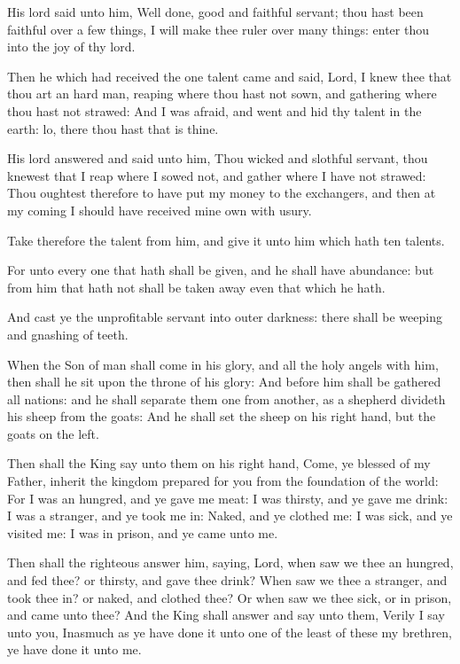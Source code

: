 \Verse His lord said unto him, Well done, good and faithful servant; thou hast been faithful over a few things, I will make thee ruler over many things: enter thou into the joy of thy lord.

\Verse Then he which had received the one talent came and said, Lord, I knew thee that thou art an hard man, reaping where thou hast not sown, and gathering where thou hast not strawed: \Verse And I was afraid, and went and hid thy talent in the earth: lo, there thou hast that is thine.

\Verse His lord answered and said unto him, Thou wicked and slothful servant, thou knewest that I reap where I sowed not, and gather where I have not strawed: \Verse Thou oughtest therefore to have put my money to the exchangers, and then at my coming I should have received mine own with usury.

\Verse Take therefore the talent from him, and give it unto him which hath ten talents.

\Verse For unto every one that hath shall be given, and he shall have abundance: but from him that hath not shall be taken away even that which he hath.

\Verse And cast ye the unprofitable servant into outer darkness: there shall be weeping and gnashing of teeth.

\Verse When the Son of man shall come in his glory, and all the holy angels with him, then shall he sit upon the throne of his glory: \Verse And before him shall be gathered all nations: and he shall separate them one from another, as a shepherd divideth his sheep from the goats: \Verse And he shall set the sheep on his right hand, but the goats on the left.

\Verse Then shall the King say unto them on his right hand, Come, ye blessed of my Father, inherit the kingdom prepared for you from the foundation of the world: \Verse For I was an hungred, and ye gave me meat: I was thirsty, and ye gave me drink: I was a stranger, and ye took me in: \Verse Naked, and ye clothed me: I was sick, and ye visited me: I was in prison, and ye came unto me.

\Verse Then shall the righteous answer him, saying, Lord, when saw we thee an hungred, and fed thee? or thirsty, and gave thee drink?  \Verse When saw we thee a stranger, and took thee in? or naked, and clothed thee?  \Verse Or when saw we thee sick, or in prison, and came unto thee?  \Verse And the King shall answer and say unto them, Verily I say unto you, Inasmuch as ye have done it unto one of the least of these my brethren, ye have done it unto me.

